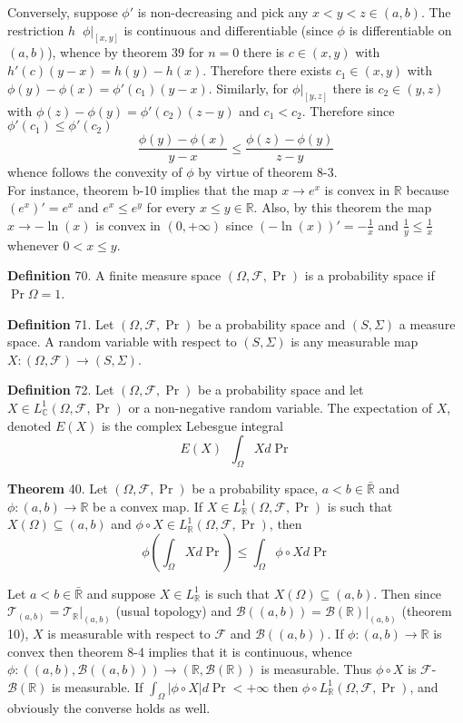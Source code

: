 \documentclass[a4paper]{article}
\newcommand{\clo}[1]{\left [ #1 \right ]}
\newcommand{\brac}[1]{\left ( #1 \right )}
\newcommand{\induc}[1]{\left . #1 \right \vert}
\newcommand{\abs}[1]{\left | #1 \right |}
\newcommand{\Rbar}{{\bar{\mathbb{R}}}}
\newcommand{\Real}{\mathbb{R}}
\newcommand{\Cplx}{\mathbb{C}}
\newcommand{\Tcal}{\mathcal{T}}
\newcommand{\Fcal}{\mathcal{F}}
\newcommand{\borel}[1]{\mathcal{B}\brac{#1}}
\newcommand{\defn}{\mathop{\overset{\Delta}{=}}\nolimits}
\begin{document}
Conversely, suppose $\phi'$ is non-decreasing and pick any $x<y<z \in \brac{a,b}$. The restriction $h\defn \induc{\phi}_{\clo{x,y}}$ is continuous and differentiable (since $\phi$ is differentiable on $\brac{a,b}$), whence by theorem 39 for $n=0$ there is $c\in \brac{x,y}$ with $h'\brac{c}\brac{y-x} = h\brac{y}-h\brac{x}$. Therefore there exists $c_1\in \brac{x,y}$ with $\phi\brac{y} - \phi\brac{x} = \phi'\brac{c_1}\brac{y-x}$. Similarly, for $\induc{\phi}_{\clo{y,z}}$ there is $c_2\in \brac{y,z}$ with $\phi\brac{z}-\phi\brac{y} = \phi'\brac{c_2}\brac{z-y}$ and $c_1<c_2$. Therefore since $\phi'\brac{c_1}\leq \phi'\brac{c_2}$ \[\frac{\phi\brac{y}-\phi\brac{x}}{y-x}\leq \frac{\phi\brac{z}-\phi\brac{y}}{z-y}\] whence follows the convexity of $\phi$ by virtue of theorem 8-3.\\

For instance, theorem b-10 implies that the map $x\to e^x$ is convex in $\Real$ because $\brac{e^x}' = e^x$ and $e^x\leq e^y$ for every $x\leq y\in \Real$. Also, by this theorem the map $x\to -\ln\brac{x}$ is convex in $\brac{0,+\infty}$ since $\brac{-\ln\brac{x}}' = -\frac{1}{x}$ and $\frac{1}{y}\leq\frac{1}{x}$ whenever $0<x\leq y$.

\noindent \textbf{Definition} 70.
A finite measure space $\brac{\Omega, \Fcal, \Pr}$ is a probability space if $\Pr{\Omega} = 1$.

\noindent \textbf{Definition} 71.
Let $\brac{\Omega, \Fcal, \Pr}$ be a probability space and $\brac{S,\Sigma}$ a measure space. A random variable with respect to $\brac{S,\Sigma}$ is any measurable map $X:\brac{\Omega, \Fcal}\to \brac{S, \Sigma}$.

\noindent \textbf{Definition} 72.
Let $\brac{\Omega, \Fcal, \Pr}$ be a probability space and let $X\in L^1_\Cplx\brac{\Omega, \Fcal, \Pr}$ or a non-negative random variable. The expectation of $X$, denoted $E\brac{X}$ is the complex Lebesgue integral \[E\brac{X}\defn \int_\Omega X d\Pr\]

\label{thm:jensen} \noindent \textbf{Theorem} 40.
Let $\brac{\Omega, \Fcal, \Pr}$ be a probability space, $a<b\in \Rbar$ and $\phi:\brac{a,b}\to \Real$ be a convex map. If $X\in L^1_\Real\brac{\Omega, \Fcal, \Pr}$ is such that $X\brac{\Omega}\subseteq \brac{a,b}$ and $\phi\circ X\in L^1_\Real\brac{\Omega, \Fcal, \Pr}$, then \[\phi\brac{\int_\Omega X d\Pr} \leq \int_\Omega \phi\circ X d\Pr\]

Let $a<b\in \Rbar$ and suppose $X\in L^1_\Real$ is such that $X\brac{\Omega}\subseteq \brac{a,b}$. Then since $\Tcal_{\brac{a,b}} = \induc{\Tcal_\Real}_{\brac{a,b}}$ (usual topology) and $\borel{\brac{a,b}} = \induc{\borel{\Real}}_{\brac{a,b}}$ (theorem 10), $X$ is measurable with respect to $\Fcal$ and $\borel{\brac{a,b}}$. If $\phi:\brac{a,b}\to\Real$ is convex then theorem 8-4 implies that it is continuous, whence $\phi:\brac{\brac{a,b},\borel{\brac{a,b}}} \to \brac{\Real, \borel{\Real}}$ is measurable. Thus $\phi\circ X$ is $\Fcal$-$\borel{\Real}$ is measurable. If $\int_\Omega \abs{\phi\circ X} d\Pr < +\infty$ then $\phi\circ L^1_\Real\brac{\Omega, \Fcal, \Pr}$, and obviously the converse holds as well.
\end{document}
